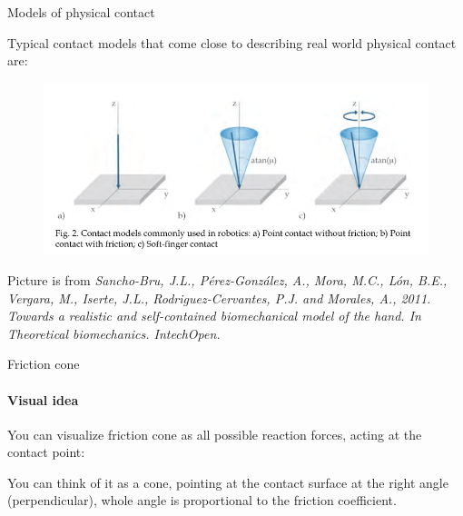 \documentclass{beamer}
\begin{document}
\begin{frame}{Models of physical contact}
\begin{flushleft}

Typical contact models that come close to describing real world physical contact are:

\begin{figure}
    \centering
    \includegraphics[width= \linewidth]{fig2.png}
    \label{fig:contact}
\end{figure}

\scriptsize{Picture is from \emph{Sancho-Bru, J.L., P\'{e}rez-Gonz\'{a}lez, A., Mora, M.C., L\'{o}n, B.E., Vergara, M., Iserte, J.L., Rodriguez-Cervantes, P.J. and Morales, A., 2011. Towards a realistic and self-contained biomechanical model of the hand. In Theoretical biomechanics. IntechOpen.}}

\end{flushleft}
\end{frame}



\begin{frame}{Friction cone}
\framesubtitle{Visual idea}
\begin{flushleft}

You can visualize friction cone as all possible reaction forces, acting at the contact point:

\begin{figure}
    \centering
    
    \label{fig:contact}
\end{figure}

You can think of it as a cone, pointing at the contact surface at the right angle (perpendicular), whole angle is proportional to the friction coefficient.

\end{flushleft}
\end{frame}
\end{document}
